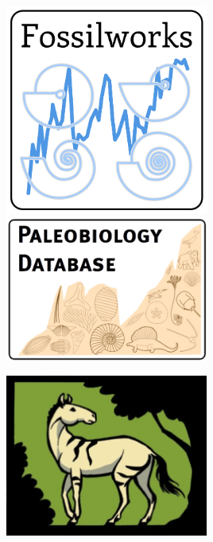 \documentclass{beamer}
\begin{document}
\begin{frame}
\begin{columns}
\begin{column}{0.5\textwidth}
      \includegraphics[height = 0.3\textheight, width = 0.5\textwidth, keepaspectratio = true]{figure/fossilworks}
      \includegraphics[width = 0.5\textwidth, keepaspectratio = true]{figure/paleodb}

      \includegraphics[height = 0.3\textheight, width = 0.5\textwidth, keepaspectratio = true]{figure/now}
    \end{column}
  \end{columns}
\end{frame}

\appendix
\end{document}
